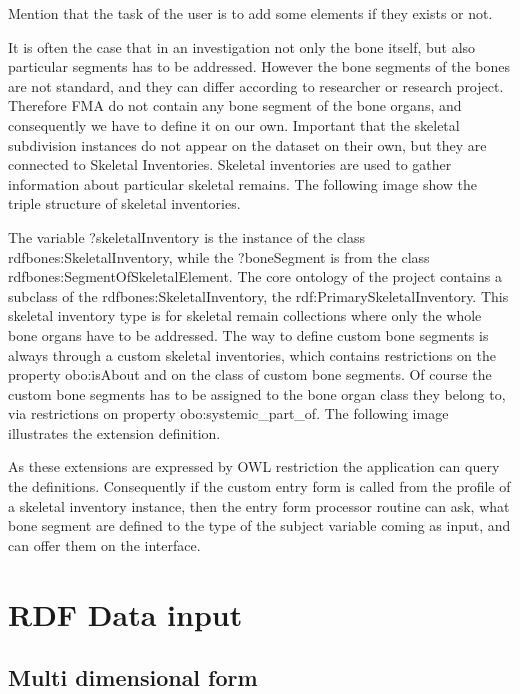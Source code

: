 Mention that the task of the user is to add some elements if they exists or not.


It is often the case that in an investigation not only the bone itself, but also particular segments has to be addressed. However the bone segments of the bones are not standard, and they can differ according to researcher or research project. Therefore FMA do not contain any bone segment of the bone organs, and consequently we have to define it on our own. 
Important that the skeletal subdivision instances do not appear on the dataset on their own, but they are connected to Skeletal Inventories. Skeletal inventories are used to gather information about particular skeletal remains.  The following image show the triple structure of skeletal inventories.


The variable ?skeletalInventory is the instance of the class rdfbones:SkeletalInventory, while the ?boneSegment is from the class rdfbones:SegmentOfSkeletalElement. The core ontology of the project contains a subclass of the rdfbones:SkeletalInventory, the rdf:PrimarySkeletalInventory. This skeletal inventory type is for skeletal remain collections where only the whole bone organs have to be addressed.  The way to define custom bone segments is always through a custom skeletal inventories, which contains restrictions on the property obo:isAbout and on the class of custom bone segments. Of course the custom bone segments has to be assigned to the bone organ class they belong to, via restrictions on property obo:systemic\_part\_of. The following image illustrates the extension definition.



As these extensions are expressed by OWL restriction the application can query the definitions. Consequently if the custom entry form is called from the profile of a skeletal inventory instance, then the entry form processor routine can ask, what bone segment are defined to the type of the subject variable coming as input, and can offer them on the interface.



\section{RDF Data input}

\subsection{Multi dimensional form}

